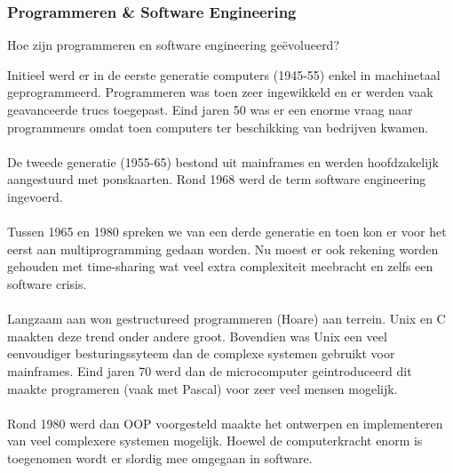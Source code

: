 \documentclass[../main.tex]{subfiles}
\begin{document}
\subsubsection{Programmeren \& Software Engineering}
\begin{question}
Hoe zijn programmeren en software engineering ge\"evolueerd?
\end{question}
\begin{solution}
Initieel werd er in de eerste generatie computers (1945-55) enkel in machinetaal geprogrammeerd.
Programmeren was toen zeer ingewikkeld en er werden vaak geavanceerde trucs toegepast.
Eind jaren 50 was er een enorme vraag naar programmeurs omdat toen computers ter beschikking van bedrijven kwamen.
\\\\
De tweede generatie (1955-65) bestond uit mainframes en werden hoofdzakelijk aangestuurd met ponskaarten.
Rond 1968 werd de term software engineering ingevoerd.
\\\\
Tussen 1965 en 1980 spreken we van een derde generatie en toen kon er voor het eerst aan multiprogramming gedaan worden.
Nu moest er ook rekening worden gehouden met time-sharing wat veel extra complexiteit meebracht en zelfs een software crisis.
\\\\
Langzaam aan won gestructureed programmeren (Hoare) aan terrein.
Unix en C maakten deze trend onder andere groot.
Bovendien was Unix een veel eenvoudiger besturingssyteem dan de complexe systemen gebruikt voor mainframes.
Eind jaren 70 werd dan de microcomputer geintroduceerd dit maakte programeren (vaak met Pascal) voor zeer veel mensen mogelijk.
\\\\
Rond 1980 werd dan OOP voorgesteld maakte het ontwerpen en implementeren van veel complexere systemen mogelijk.
Hoewel de computerkracht enorm is toegenomen wordt er slordig mee omgegaan in software.
\end{solution}
\end{document}
